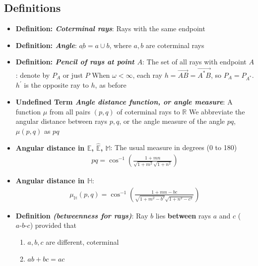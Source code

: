 \documentclass{report}
\begin{document}
    \subsection{Definitions}
    \begin{itemize}
        \item \textbf{Definition: \textit{Coterminal rays}}: Rays with the same endpoint
        \item \textbf{Definition: \textit{Angle}}: $\underline{ab} = a \cup b $, where $a,b$ are coterminal rays
        \item \textbf{Definition: \textit{Pencil of rays at point $A$}}: The set of all rays with endpoint $A$: denote by $P_{A}$ or just $P$
            \bigbreak \noindent 
            When $\omega < \infty$, each ray $h = \overrightarrow{AB} = \overrightarrow{A^{*}B}$, so $P_{A} = P_{A^{*}} $. $h^{\prime} $ is the opposite ray to $h$, as before
        \item \textbf{Undefined Term \textit{Angle distance function, or angle measure}}: A function $\mu$ from all pairs $(p,q) $ of coterminal rays to $\mathbb{R}$
            \bigbreak \noindent 
            We abbreviate the angular distance between rays $p,q$, or the angle measure of the angle $pq$, $\mu(p,q)$ as $pq$ 
        \item \textbf{Angular distance in $\mathbb{E}$, $\hat{\mathbb{E}}$, $\mathbb{M} $}: The usual measure in degrees (0 to 180)
            \begin{align*}
                pq = \cos^{-1}{\left(\frac{1+mn}{\sqrt{1+m^{2}}\sqrt{1+n^{2}}}\right)}
            \end{align*}
        \item \textbf{Angular distance in $\mathbb{H}$}:
            \begin{align*}
                \mu_{\mathbb{H}}(p,q) = \cos^{-1}{\left(\frac{1+mn-bc}{\sqrt{1+m^{2}-b^{2}}\sqrt{1+n^{2}-c^{2}}}\right)} 
            \end{align*}
        \item \textbf{Definition \textit{(betweenness for rays)}}: Ray $b$ lies \textbf{between} rays $a$ and $c$ ($ a\text{-}b\text{-}c $) provided that
            \begin{enumerate}[label=(\alph*)]
                \item $a,b,c$ are different, coterminal
                \item $ab + bc = ac $
            \end{enumerate}


\end{itemize}
\end{document}
